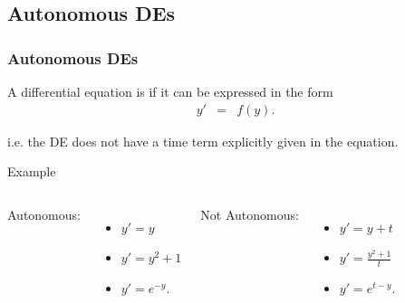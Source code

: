 \subsection{Autonomous DEs}

\begin{frame}
  \frametitle{Autonomous DEs}

  \begin{definition}
    A differential equation is  if it can be
    expressed in the form
    \begin{eqnarray*}
      y' & = & f(y).
    \end{eqnarray*}
  \end{definition}
  i.e. the DE does not have a time term explicitly given in the
  equation.


\end{frame}


\begin{frame}{Example}
  
  \begin{columns}

    Autonomous:
    \begin{itemize}
    \item $y'=y$ 
    \item $y'=y^2+1$
    \item $y'=e^{-y}$.
    \end{itemize}


    Not Autonomous:
    \begin{itemize}
    \item $y'=y+t$ 
    \item $y'=\frac{y^2+1}{t}$
    \item $y'=e^{t-y}$.
    \end{itemize}

  \end{columns}

\end{frame}

